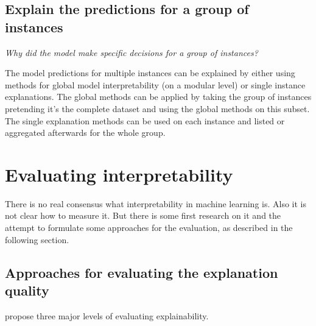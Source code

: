 \documentclass[12pt,]{krantz}
\theoremstyle{definition}
\theoremstyle{definition}
\theoremstyle{definition}
\theoremstyle{remark}
\begin{document}
\subsection{Explain the predictions for a group of
instances}\label{explain-the-predictions-for-a-group-of-instances}

\emph{Why did the model make specific decisions for a group of
instances?}

The model predictions for multiple instances can be explained by either
using methods for global model interpretability (on a modular level) or
single instance explanations. The global methods can be applied by
taking the group of instances pretending it's the complete dataset and
using the global methods on this subset. The single explanation methods
can be used on each instance and listed or aggregated afterwards for the
whole group.

\section{Evaluating interpretability}\label{evaluating-interpretability}

There is no real consensus what interpretability in machine learning is.
Also it is not clear how to measure it. But there is some first research
on it and the attempt to formulate some approaches for the evaluation,
as described in the following section.

\subsection{Approaches for evaluating the explanation
quality}\label{approaches-for-evaluating-the-explanation-quality}

\citet{Doshi-Velez2017} propose three major levels of evaluating
explainability.
\end{document}
